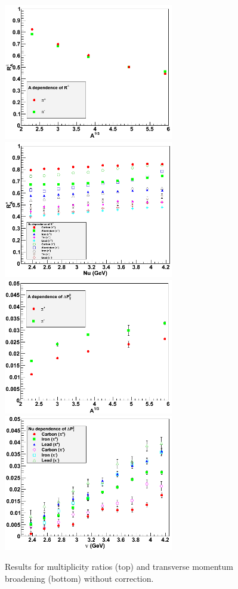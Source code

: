 \begin{figure}[htb]
\centering
\includegraphics[width=7.4cm] {chap5-fig/a_RvA.png} 
\includegraphics[width=7.4cm] {chap5-fig/a_RvZ.png} 
\includegraphics[width=7.4cm] {chap5-fig/a_PvA.png} 
\includegraphics[width=7.4cm] {chap5-fig/a_PvNu.png} 
\caption {Results for multiplicity ratios (top) and transverse momentum 
broadening (bottom) without correction.}
\label{fig:prelim}
\end{figure}


